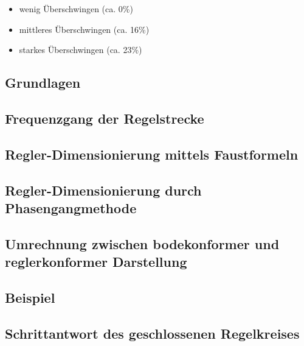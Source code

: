 \begin{itemize}
    \item
        wenig \"Uberschwingen (ca. 0\%)
    \item
        mittleres \"Uberschwingen (ca. 16\%)
    \item
        starkes \"Uberschwingen (ca. 23\%)
\end{itemize}

\subsection{Grundlagen}


\subsection{Frequenzgang der Regelstrecke}
\label{subs:frequenzgang}


\subsection{Regler-Dimensionierung mittels Faustformeln}
\label{subs:faustformeln}


\subsection{Regler-Dimensionierung durch Phasengangmethode}


\subsection{Umrechnung zwischen bodekonformer und reglerkonformer Darstellung}


\clearpage
\subsection{Beispiel}


\subsection{Schrittantwort des geschlossenen Regelkreises}

